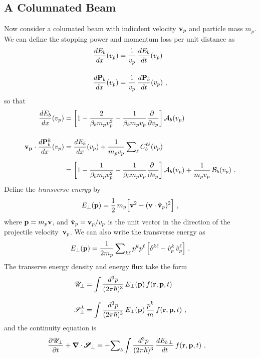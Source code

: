 \documentclass[preprint,12pt,eqsecnum,nofootinbib,amsmath,amssymb]{revtex4}
\begin{document}
\subsection{A Columnated Beam}

Now consider a columated beam with indicdent velocity ${\bf v}_p$
and particle mass $m_p$. We can define the stopping power and
momentum loss per unit distance as
\begin{align}
  \frac{d E_b}{dx}(v_p)
  &=
  \frac{1}{v_p}\, \frac{dE_b}{dt}(v_p)
  \\[11pt]
  \frac{d {\bf P}_b}{dx}(v_p)
  &=
  \frac{1}{v_p}\, \frac{d{\bf P}_b}{dt}(v_p)
  \ ,
\end{align}
so that
\begin{align}
  \frac{d E_b}{dx}(v_p)
  &=
  \left[ 1 -  \frac{2}{\beta_b m_p v_p^2} -\frac{1}{\beta_b m_p v_p} 
  \frac{\partial \,\,}{\partial v_p}  \right] {\mathcal A}_b(v_p) 
  \label{eq_E_dEdt_p}
  \\[11pt]
  {\bf v_p} \cdot \frac{d {\bf P}_b^k}{dx}(v_p)
  &= 
  \frac{dE_b}{dx}(v_p)
  + 
  \frac{1}{m_p v_p} \,{\sum}_\ell \,  C_b^{\ell \ell}(v_p) 
  \\[5pt]
  &=
    \left[ 1 -  \frac{1}{\beta_b m_p v_p^2} -\frac{1}{\beta_b m_p v_p} 
  \frac{\partial \,\,}{\partial v_p}  \right] {\mathcal A}_b(v_p) 
  +  
  \frac{1}{m_p v_p} \,
  {\cal B}_b(v_p)
  \ .
 \label{eq_P_dEdt_p}
\end{align}
Define the {\em transverse energy} by
\begin{align}
   E_\perp({\bf p})
   =
   \frac{1}{2}\, m_p 
   \Big[
   {\bf v}^2 - ({\bf v} \cdot \hat {\bf v}_p)^2
   \Big]
   \ ,
\end{align}
where ${\bf p} = m_p {\bf v}$, and $\hat {\bf v}_p = {\bf v}_p/v_p$ 
is the unit vector in the direction of the projectile velocity~${\bf v}_p$. 
We can also write the transverse energy as
\begin{align}
   E_\perp({\bf p})
   =
   \frac{1}{2 m_p} \, {\sum}_{k \ell} \,  p^k p^\ell \,
   \Big[ \delta^{k \ell} - \hat v_p^k \, \hat v_p^\ell
   \Big]
   \ .
\end{align}
The transerve energy density and energy flux take the form
\begin{align}
  {\mathscr U}_\perp
  &=
  \int \frac{d^3 p}{(2\pi\hbar)^3}\,E_\perp({\bf p}) \, f({\bf r}, {\bf p}, t)
  \label{eq_E_perp}
  \\[8pt]
  {\mathscr S}^k_\perp
  &=
   \int \frac{d^3 p}{(2\pi\hbar)^3}\, E_\perp({\bf p})\, \frac{p^k}{m}\, 
   f({\bf r}, {\bf p}, t)
   \label{eq_Eflux_perp}
  \ ,
\end{align}
and the continuity equation is
\begin{align}
  \frac{\partial {\mathscr U}_\perp}{\partial t}
  +
  {\bm\nabla} \cdot \pmb{\mathscr{S}}_{\!\perp}
  &=
  -{\sum}_b \int \frac{d^3 p}{(2\pi\hbar)^3} \,
  \frac{d E_{b \, \perp}}{dt} \, f({\bf r}, {\bf p}, t)
  \ .
  \label{eq_q_continuity_perp}
\end{align}
\end{document}
